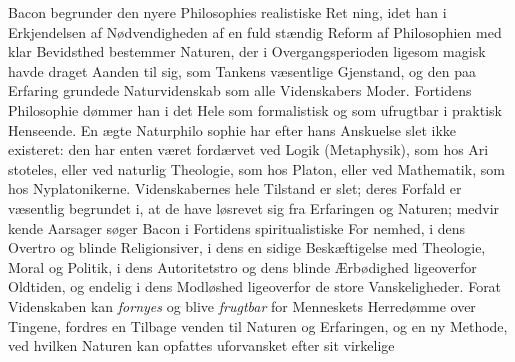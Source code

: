 \documentclass[12pt,a4paper]{book}
\begin{document}
Bacon begrunder den nyere Philosophies realistiske Ret\-%
ning, idet han i Erkjendelsen af Nødvendigheden af en fuld\-%
stændig Reform af Philosophien med klar Bevidsthed bestemmer
Naturen, der i Overgangsperioden ligesom magisk havde draget
Aanden til sig, som Tankens væsentlige Gjenstand, og den paa
Erfaring grundede Naturvidenskab som alle Videnskabers Moder.
Fortidens Philosophie dømmer han i det Hele som formalistisk
og som ufrugtbar i praktisk Henseende. En ægte Naturphilo\-%
sophie har efter hans Anskuelse slet ikke existeret: den har
enten været fordærvet ved Logik (Metaphysik), som hos Ari\-%
stoteles, eller ved naturlig Theologie, som hos Platon, eller
ved Mathematik, som hos Nyplatonikerne. Videnskabernes
hele Tilstand er slet; deres Forfald er væsentlig begrundet i,
at de have løsrevet sig fra Erfaringen og Naturen; medvir\-%
kende Aarsager søger Bacon i Fortidens spiritualistiske For\-%
nemhed, i dens Overtro og blinde Religionsiver, i dens en\-%
sidige Beskæftigelse med Theologie, Moral og Politik, i dens
Autoritetstro og dens blinde Ærbødighed ligeoverfor Oldtiden,
og endelig i dens Modløshed ligeoverfor de store Vanskeligheder.
Forat Videnskaben kan \emph{fornyes} og blive \emph{frugtbar} for
Menneskets Herredømme over Tingene, fordres en Tilbage\-%
venden til Naturen og Erfaringen, og en ny Methode, ved
hvilken Naturen kan opfattes uforvansket efter sit virkelige
\end{document}
